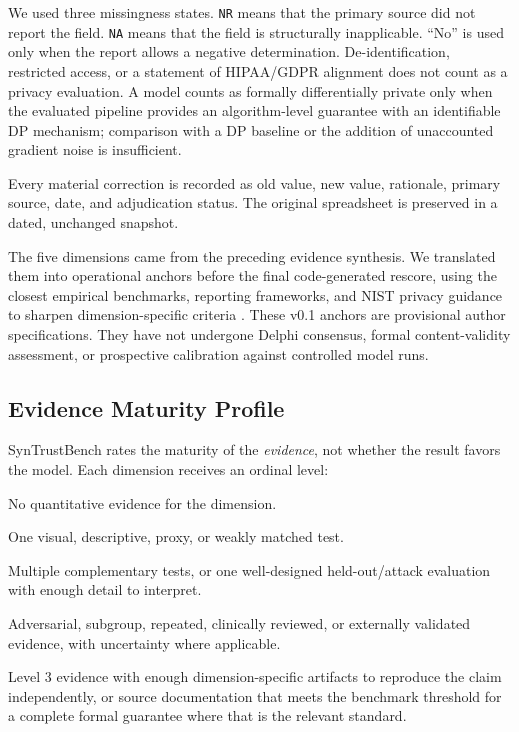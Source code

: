 \documentclass[11pt,letterpaper]{article}
\begin{document}
We used three missingness states. \texttt{NR} means that the primary source did not report the field. \texttt{NA} means that the field is structurally inapplicable. ``No'' is used only when the report allows a negative determination. De-identification, restricted access, or a statement of HIPAA/GDPR alignment does not count as a privacy evaluation. A model counts as formally differentially private only when the evaluated pipeline provides an algorithm-level guarantee with an identifiable DP mechanism; comparison with a DP baseline or the addition of unaccounted gradient noise is insufficient.

Every material correction is recorded as old value, new value, rationale, primary source, date, and adjudication status. The original spreadsheet is preserved in a dated, unchanged snapshot.

The five dimensions came from the preceding evidence synthesis. We translated them into operational anchors before the final code-generated rescore, using the closest empirical benchmarks, reporting frameworks, and NIST privacy guidance to sharpen dimension-specific criteria \citep{kaabachi2025privacyutility,zamzmi2025scorecard,castagno2026trustsd,near2025nist}. These v0.1 anchors are provisional author specifications. They have not undergone Delphi consensus, formal content-validity assessment, or prospective calibration against controlled model runs.

\subsection{Evidence Maturity Profile}

SynTrustBench rates the maturity of the \emph{evidence}, not whether the result favors the model. Each dimension receives an ordinal level:

\begin{description}[style=nextline]
    \item[0 --- Not evaluated.] No quantitative evidence for the dimension.
    \item[1 --- Descriptive or surrogate.] One visual, descriptive, proxy, or weakly matched test.
    \item[2 --- Appropriate held-out or multi-metric evidence.] Multiple complementary tests, or one well-designed held-out/attack evaluation with enough detail to interpret.
    \item[3 --- Stress-tested evidence.] Adversarial, subgroup, repeated, clinically reviewed, or externally validated evidence, with uncertainty where applicable.
    \item[4 --- Independently reproducible or formally complete.] Level 3 evidence with enough dimension-specific artifacts to reproduce the claim independently, or source documentation that meets the benchmark threshold for a complete formal guarantee where that is the relevant standard.
\end{description}
\end{document}
